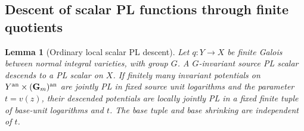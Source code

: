 \documentclass[11pt]{article}
\newtheorem{lemma}[theorem]{Lemma}
\theoremstyle{definition}
\theoremstyle{remark}
\numberwithin{equation}{section}
\begin{document}
\subsection{Descent of scalar PL functions through finite quotients}

\begin{lemma}[Ordinary local scalar PL descent]
\label{r11p:pl-descent}
Let $q:Y\to X$ be finite Galois between normal integral varieties, with
group $G$.  A $G$-invariant source PL scalar descends to a PL scalar on
$X$.  If finitely many invariant potentials on
$Y^{\rm an}\times(\mathbf G_m)^{\rm an}$ are jointly PL in fixed source
unit logarithms and the parameter $t=v(z)$, their descended potentials
are locally jointly PL in a fixed finite tuple of base-unit logarithms
and $t$.  The base tuple and base shrinking are independent of $t$.
\end{lemma}
\end{document}

